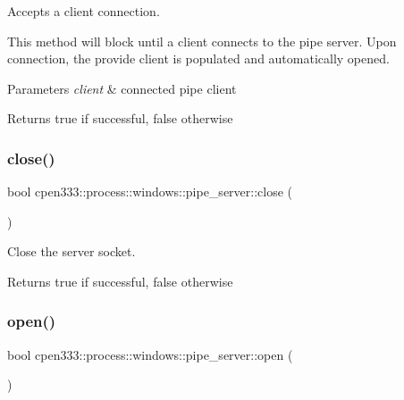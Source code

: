 Accepts a client connection. 

This method will block until a client connects to the pipe server. Upon connection, the provide client is populated and automatically opened.


\begin{DoxyParams}{Parameters}
{\em client} & connected pipe client \\
\hline
\end{DoxyParams}
\begin{DoxyReturn}{Returns}
true if successful, false otherwise 
\end{DoxyReturn}
\mbox{\label{classcpen333_1_1process_1_1windows_1_1pipe__server_a4c27e283566395d1f7236bff91413737}} 
\subsubsection{\texorpdfstring{close()}{close()}}
{\footnotesize\ttfamily bool cpen333\+::process\+::windows\+::pipe\+\_\+server\+::close (\begin{DoxyParamCaption}{ }\end{DoxyParamCaption})\hspace{0.3cm}{\ttfamily [inline]}}



Close the server socket. 

\begin{DoxyReturn}{Returns}
true if successful, false otherwise 
\end{DoxyReturn}
\mbox{\label{classcpen333_1_1process_1_1windows_1_1pipe__server_a3d44407143efc64e27b5b6455ad8ae8c}} 
\subsubsection{\texorpdfstring{open()}{open()}}
{\footnotesize\ttfamily bool cpen333\+::process\+::windows\+::pipe\+\_\+server\+::open (\begin{DoxyParamCaption}{ }\end{DoxyParamCaption})\hspace{0.3cm}{\ttfamily [inline]}}



